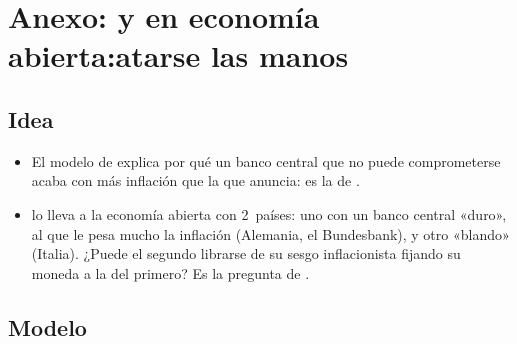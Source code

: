 \documentclass[11pt]{article}
\begin{document}
\section{Anexo:  y  en economía abierta:\cortetitulo atarse las manos}\label{anexo:barro-gordon}

\subsection{Idea}

\begin{itemize}
\item El modelo de \textcite{BarroGordon1983Positive} explica por qué un banco central que no puede comprometerse acaba con más inflación que la que anuncia: es la  de \textcite{KydlandPrescott1977Rules} .
\item \textcite[cap.~2]{DeGrauwe2022Economics} lo lleva a la economía abierta con 2~países: uno con un banco central «duro», al que le pesa mucho la inflación (Alemania, el Bundesbank), y otro «blando» (Italia). ¿Puede el segundo librarse de su sesgo inflacionista fijando su moneda a la del primero? Es la pregunta de \textcite{GiavazziPagano1988Advantage}.
\end{itemize}

\subsection{Modelo}
\end{document}
